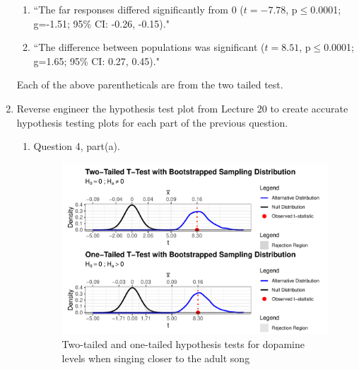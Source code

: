 \documentclass{article}\usepackage[]{graphicx}\usepackage[]{xcolor}
\begin{document}
\begin{enumerate}
\begin{enumerate}
  \item ``The far responses differed significantly from 0 ($t=-7.78$, p$\leq$0.0001; g=-1.51; 95\% CI: -0.26, -0.15)."
  
  \item ``The difference between populations was significant ($t=8.51$, p$\leq$0.0001; g=1.65; 95\% CI: 0.27, 0.45)."
\end{enumerate}

Each of the above parentheticals are from the two tailed test.
\item Reverse engineer the hypothesis test plot from Lecture 20 to create accurate
hypothesis testing plots for each part of the previous question.
\begin{enumerate}
  \item Question 4, part(a).
   \begin{figure}[H]
  \begin{center}
  \includegraphics[scale=.8]{close.hyp.plots.pdf}
  \caption{Two-tailed and one-tailed hypothesis tests for dopamine levels when singing closer to the adult song}
  \label{plot3}
  \end{center}
\end{figure} 

\newpage


\end{enumerate}
\end{enumerate}
\end{document}
